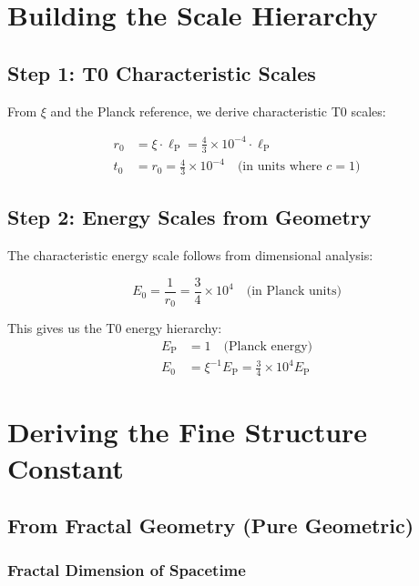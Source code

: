 \documentclass[12pt,a4paper]{article}
\newcommand{\lP}{\ell_{\text{P}}}
\newcommand{\EP}{E_{\text{P}}}
\newcommand{\rzero}{r_0}
\newcommand{\tzero}{t_0}
\newcommand{\Ezero}{E_0}
\newcommand{\xipar}{\xi}  %
\begin{document}
	\section{Building the Scale Hierarchy}
	
	\subsection{Step 1: T0 Characteristic Scales}
	
	From $\xipar$ and the Planck reference, we derive characteristic T0 scales:
	
	\begin{align}
		\rzero &= \xipar \cdot \lP = \frac{4}{3} \times 10^{-4} \cdot \lP \\
		\tzero &= \rzero = \frac{4}{3} \times 10^{-4} \quad \text{(in units where } c=1)
	\end{align}
	
	\subsection{Step 2: Energy Scales from Geometry}
	
	The characteristic energy scale follows from dimensional analysis:
	
	\begin{equation}
		\Ezero = \frac{1}{\rzero} = \frac{3}{4} \times 10^{4} \quad \text{(in Planck units)}
	\end{equation}
	
	This gives us the T0 energy hierarchy:
	\begin{align}
		\EP &= 1 \quad \text{(Planck energy)} \\
		\Ezero &= \xipar^{-1} \EP = \frac{3}{4} \times 10^{4} \EP
	\end{align}
	
	\section{Deriving the Fine Structure Constant}
	
	\subsection{From Fractal Geometry (Pure Geometric)}
	
	\subsubsection{Fractal Dimension of Spacetime}
	
\end{document}

